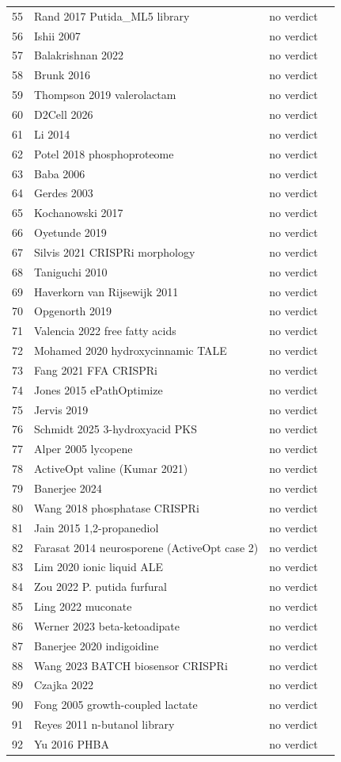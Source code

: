 \begin{longtable}{@{}r L{88mm} L{40mm} L{24mm}@{}}
55 & Rand 2017 Putida\_ML5 library & no verdict &  \\
56 & Ishii 2007 & no verdict &  \\
57 & Balakrishnan 2022 & no verdict &  \\
58 & Brunk 2016 & no verdict &  \\
59 & Thompson 2019 valerolactam & no verdict &  \\
60 & D2Cell 2026 & no verdict &  \\
61 & Li 2014 & no verdict &  \\
62 & Potel 2018 phosphoproteome & no verdict &  \\
63 & Baba 2006 & no verdict &  \\
64 & Gerdes 2003 & no verdict &  \\
65 & Kochanowski 2017 & no verdict &  \\
66 & Oyetunde 2019 & no verdict &  \\
67 & Silvis 2021 CRISPRi morphology & no verdict &  \\
68 & Taniguchi 2010 & no verdict &  \\
69 & Haverkorn van Rijsewijk 2011 & no verdict &  \\
70 & Opgenorth 2019 & no verdict &  \\
71 & Valencia 2022 free fatty acids & no verdict &  \\
72 & Mohamed 2020 hydroxycinnamic TALE & no verdict &  \\
73 & Fang 2021 FFA CRISPRi & no verdict &  \\
74 & Jones 2015 ePathOptimize & no verdict &  \\
75 & Jervis 2019 & no verdict &  \\
76 & Schmidt 2025 3-hydroxyacid PKS & no verdict &  \\
77 & Alper 2005 lycopene & no verdict &  \\
78 & ActiveOpt valine (Kumar 2021) & no verdict &  \\
79 & Banerjee 2024 & no verdict &  \\
80 & Wang 2018 phosphatase CRISPRi & no verdict &  \\
81 & Jain 2015 1,2-propanediol & no verdict &  \\
82 & Farasat 2014 neurosporene (ActiveOpt case 2) & no verdict &  \\
83 & Lim 2020 ionic liquid ALE & no verdict &  \\
84 & Zou 2022 P. putida furfural & no verdict &  \\
85 & Ling 2022 muconate & no verdict &  \\
86 & Werner 2023 beta-ketoadipate & no verdict &  \\
87 & Banerjee 2020 indigoidine & no verdict &  \\
88 & Wang 2023 BATCH biosensor CRISPRi & no verdict &  \\
89 & Czajka 2022 & no verdict &  \\
90 & Fong 2005 growth-coupled lactate & no verdict &  \\
91 & Reyes 2011 n-butanol library & no verdict &  \\
92 & Yu 2016 PHBA & no verdict &  \\
\end{longtable}
\endgroup
